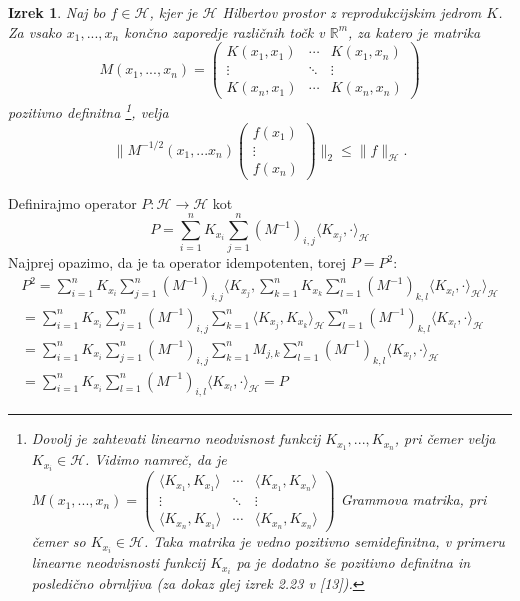 \documentclass[12pt,a4paper]{amsart}
\theoremstyle{definition} %
\theoremstyle{plain} %
\newtheorem{izrek}[definicija]{Izrek}
\begin{document}
\begin{izrek}
Naj bo $f \in \mathcal{H}$, kjer je $\mathcal{H}$ Hilbertov prostor z reprodukcijskim jedrom $K$. Za vsako $x_1, ..., x_n$ končno zaporedje različnih točk v $\mathbb{R}^m$, za katero je matrika
$$
M(x_1,...,x_n) = 
 \begin{pmatrix}
  K(x_1,x_1) & \cdots & K(x_1,x_n) \\
  \vdots    & \ddots & \vdots  \\
  K(x_n,x_1) & \cdots & K(x_n,x_n) 
 \end{pmatrix}
$$
pozitivno definitna \footnote{Dovolj je zahtevati linearno neodvisnost funkcij $K_{x_1},...,K_{x_n}$, pri čemer velja $K_{x_i} \in \mathcal{H}$. Vidimo namreč, da je $ M(x_1,...,x_n) =  \begin{pmatrix}
  \langle K_{x_1}, K_{x_1} \rangle & \cdots & \langle K_{x_1}, K_{x_n} \rangle \\
  \vdots    & \ddots & \vdots  \\
  \langle K_{x_n}, K_{x_1} \rangle& \cdots & \langle K_{x_n}, K_{x_n} \rangle 
 \end{pmatrix}$ Grammova matrika, pri čemer so $K_{x_i} \in \mathcal{H}$. Taka matrika je vedno pozitivno semidefinitna, v primeru linearne neodvisnosti funkcij $K_{x_i}$ pa je dodatno še pozitivno definitna in posledično obrnljiva (za dokaz glej izrek 2.23 v [13]).}, velja
$$
\bigg\|M^{-1/2}(x_1,...x_n)
\begin{pmatrix}
  f(x_1)  \\
  \vdots     \\
  f(x_n)
 \end{pmatrix}
\bigg\|_2 \leq \|f\|_{\mathcal{H}}.
$$
\end{izrek}
\proof 
Definirajmo operator $P: \mathcal{H} \rightarrow \mathcal{H}$ kot 
$$
P = \sum_{i=1}^n K_{x_i} \sum_{j=1}^n (M^{-1})_{i,j} \langle K_{x_j}, \cdot \rangle_{\mathcal{H}}
$$
Najprej opazimo, da je ta operator idempotenten, torej $P = P^2$:
\begin{gather*}
P^2 = \sum_{i=1}^n K_{x_i} \sum_{j=1}^n (M^{-1})_{i,j} \langle K_{x_j}, \sum_{k=1}^n K_{x_k} \sum_{l=1}^n (M^{-1})_{k,l} \langle K_{x_l}, \cdot \rangle_{\mathcal{H}} \rangle_{\mathcal{H}} \\
=  \sum_{i=1}^n K_{x_i} \sum_{j=1}^n (M^{-1})_{i,j} \sum_{k=1}^{n}  \langle K_{x_j}, K_{x_k} \rangle_{\mathcal{H}} \sum_{l=1}^n (M^{-1})_{k,l} \langle K_{x_l}, \cdot \rangle_{\mathcal{H}} \\
=  \sum_{i=1}^n K_{x_i} \sum_{j=1}^n (M^{-1})_{i,j}  \sum_{k=1}^n M_{j,k}  \sum_{l=1}^n (M^{-1})_{k,l} \langle K_{x_l}, \cdot \rangle_{\mathcal{H}} 
\\
= \sum_{i=1}^n K_{x_i} \sum_{l=1}^n (M^{-1})_{i,l}  \langle K_{x_l}, \cdot \rangle_{\mathcal{H}}  = P
\end{gather*}
\end{document}
